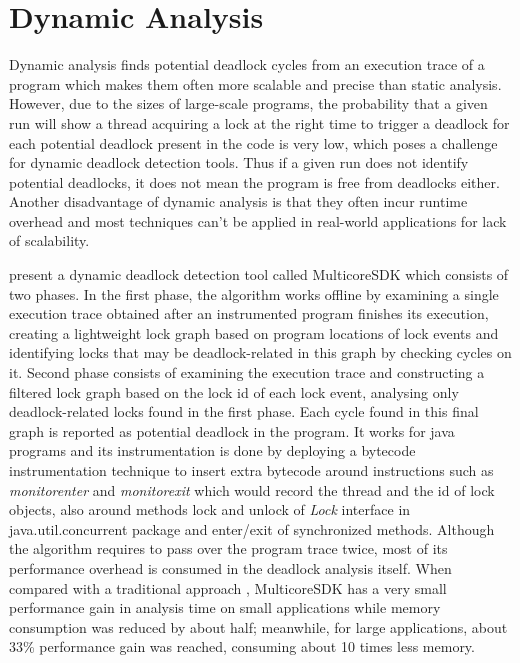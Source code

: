 \section{Dynamic Analysis}

Dynamic analysis finds potential deadlock cycles from an execution trace of a program which makes them often more scalable and precise than static analysis.
However, due to the sizes of large-scale programs, the probability that a given run will show a thread acquiring a lock at the right time to trigger a deadlock for
each potential deadlock present in the code is very low, which poses a challenge for dynamic deadlock detection tools. Thus if a given run does not identify potential
deadlocks, it does not mean the program is free from deadlocks either. Another disadvantage of dynamic analysis is that they often incur runtime overhead and most techniques
can't be applied in real-world applications for lack of scalability.

\citet{mcsdk} present a dynamic deadlock detection tool called MulticoreSDK which consists of two phases.
In the first phase, the algorithm works offline by examining a single execution trace obtained after an instrumented program finishes its execution,
creating a lightweight lock graph based on program locations of lock events and identifying locks that may be deadlock-related in this graph by checking cycles on it.
Second phase consists of examining the execution trace and constructing a filtered lock graph based on the lock id of each lock event, analysing only deadlock-related locks
found in the first phase. Each cycle found in this final graph is reported as potential deadlock in the program.
It works for java programs and its instrumentation is done by deploying a bytecode instrumentation technique \citep{tanter} to insert extra bytecode
around instructions such as \emph{monitorenter} and \emph{monitorexit} which would record the thread and the id of lock objects, also around methods lock and unlock of
\emph{Lock} interface in java.util.concurrent package and enter/exit of synchronized methods.
Although the algorithm requires to pass over the program trace twice, most of its performance overhead is consumed in the deadlock analysis itself.
When compared with a traditional approach \citep{contest}, MulticoreSDK has a very small performance gain in analysis time on small applications while memory consumption
was reduced by about half; meanwhile, for large applications, about 33\% performance gain was reached, consuming about 10 times less memory.

